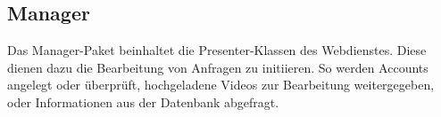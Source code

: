 \subsection{Manager} \label{service:modul:Manager}
Das Manager-Paket beinhaltet die Presenter-Klassen des Webdienstes. Diese dienen dazu die Bearbeitung von Anfragen zu initiieren. So werden Accounts angelegt oder überprüft, hochgeladene Videos zur Bearbeitung weitergegeben, oder Informationen aus der Datenbank abgefragt.